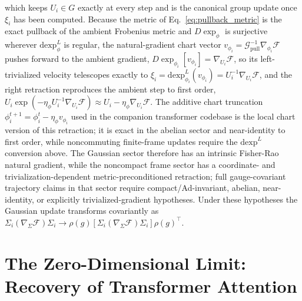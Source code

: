 \documentclass[11pt]{article}
\begin{document}
which keeps $U_i \in G$ exactly at every step and is the canonical group update once $\xi_i$ has been computed. Because the metric of Eq.~\eqref{eq:pullback_metric} is the exact pullback of the ambient Frobenius metric and $D\exp_\phi$ is surjective wherever $\mathrm{dexp}^{L}_\phi$ is regular, the natural-gradient chart vector $v_{\phi_i} = \mathcal{G}_{\mathrm{pull}}^{-1}\nabla_{\phi_i}\mathcal{F}$ pushes forward to the ambient gradient, $D\exp_{\phi_i}[v_{\phi_i}] = \nabla_{U_i}\mathcal{F}$, so its left-trivialized velocity telescopes exactly to $\xi_i = \mathrm{dexp}^{L}_{\phi_i}(v_{\phi_i}) = U_i^{-1}\nabla_{U_i}\mathcal{F}$, and the right retraction reproduces the ambient step to first order, $U_i\exp(-\eta_\phi U_i^{-1}\nabla_{U_i}\mathcal{F}) \approx U_i - \eta_\phi\nabla_{U_i}\mathcal{F}$. The additive chart truncation $\phi_i^{t+1} = \phi_i^t - \eta_\phi v_{\phi_i}$ used in the companion transformer codebase is the local chart version of this retraction; it is exact in the abelian sector and near-identity to first order, while noncommuting finite-frame updates require the $\mathrm{dexp}^{L}$ conversion above. The Gaussian sector therefore has an intrinsic Fisher-Rao natural gradient, while the noncompact frame sector has a coordinate- and trivialization-dependent metric-preconditioned retraction; full gauge-covariant trajectory claims in that sector require compact/Ad-invariant, abelian, near-identity, or explicitly trivialized-gradient hypotheses. Under these hypotheses the Gaussian update transforms covariantly as $\Sigma_i(\nabla_\Sigma\mathcal{F})\Sigma_i \to \rho(g)[\Sigma_i(\nabla_\Sigma\mathcal{F})\Sigma_i]\rho(g)^\top$.

\section{The Zero-Dimensional Limit: Recovery of Transformer Attention}\label{sec:transformers}
\end{document}
